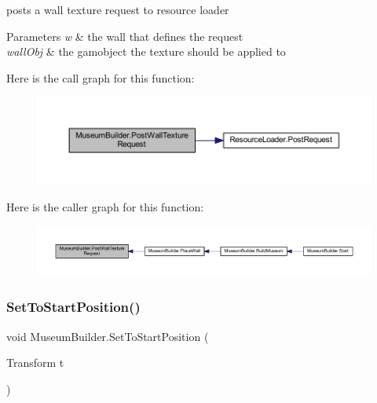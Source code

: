 posts a wall texture request to resource loader 


\begin{DoxyParams}{Parameters}
{\em w} & the wall that defines the request\\
\hline
{\em wall\+Obj} & the gamobject the texture should be applied to\\
\hline
\end{DoxyParams}
Here is the call graph for this function\+:
\nopagebreak
\begin{figure}[H]
\begin{center}
\leavevmode
\includegraphics[width=350pt]{class_museum_builder_aa4b2759977e29fa40cea22b6f31242ac_cgraph}
\end{center}
\end{figure}
Here is the caller graph for this function\+:
\nopagebreak
\begin{figure}[H]
\begin{center}
\leavevmode
\includegraphics[width=350pt]{class_museum_builder_aa4b2759977e29fa40cea22b6f31242ac_icgraph}
\end{center}
\end{figure}
\mbox{\label{class_museum_builder_a875e7252e31ad7ae28f17eb365ef5ce5}} 
\subsubsection{\texorpdfstring{Set\+To\+Start\+Position()}{SetToStartPosition()}}
{\footnotesize\ttfamily void Museum\+Builder.\+Set\+To\+Start\+Position (\begin{DoxyParamCaption}\item[{Transform}]{t }\end{DoxyParamCaption})}




